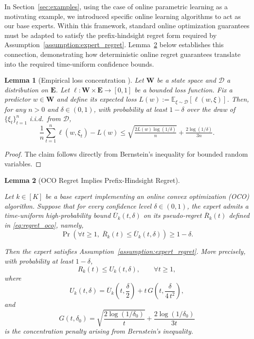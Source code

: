 \documentclass[a4paper,14pt]{extarticle}
\theoremstyle{plain}
\newtheorem{lemma}{Lemma}
\begin{document}
In Section~\ref{sec:examples}, using the case of online parametric learning as a motivating example, we introduced specific online learning algorithms to act as our base experts. Within this framework, standard online optimization guarantees must be adapted to satisfy the prefix-hindsight regret form required by Assumption~\ref{assumption:expert_regret}. Lemma~\ref{lem:prefix_to_expected} below establishes this connection, demonstrating how deterministic online regret guarantees translate into the required time-uniform confidence bounds.

\begin{lemma}[Empirical loss concentration {\normalfont\cite[Lemma B.10]{shalev2014understanding}}]
\label{lem:loss-eval}
Let $\mathbf{W}$ be a state space and $\mathcal{D}$ a distribution on $\mathbf{E}$. Let $\ell:\mathbf{W}\times\mathbf{E}\to [0,1]$ be a bounded loss function. Fix a predictor $w\in\mathbf{W}$ and define its expected loss $L(w):=\mathbb{E}_{\xi\sim\mathcal{D}}[\ell(w,\xi)]$. Then, for any $n>0$ and $\delta\in(0,1)$, with probability at least $1-\delta$ over the draw of $\{\xi_t\}_{t=1}^n$ i.i.d.\ from $\mathcal{D}$,
\begin{equation}
\frac{1}{n}\sum_{t=1}^n \ell(w,\xi_t) - L(w)
\le
\sqrt{\tfrac{2L(w)\log(1/\delta)}{n}} + \tfrac{2\log(1/\delta)}{3n}.
\end{equation}
\end{lemma}

\begin{proof}
The claim follows directly from Bernstein's inequality for bounded random variables.
\end{proof}


\begin{lemma}[OCO Regret Implies Prefix-Hindsight Regret]
\label{lem:prefix_to_expected}

Let $k \in [K]$ be a base expert implementing an online convex
optimization (OCO) algorithm. Suppose that for every confidence level
$\delta \in (0,1)$, the expert admits a time-uniform high-probability
bound $\overline U_k(t,\delta)$ on its pseudo-regret
$\overline R_k(t)$ defined in \eqref{eq:regret_oco}, namely,
\[
\Pr\!\left(
    \forall t \ge 1,\;
    \overline R_k(t)
    \le
    \overline U_k(t,\delta)
\right)
\ge 1-\delta.
\]

Then the expert satisfies
Assumption~\ref{assumption:expert_regret}. More precisely, with
probability at least $1-\delta$,
\[
R_k(t)
\le
U_k(t,\delta),
\qquad
\forall t \ge 1,
\]
where
\begin{equation}
\label{eq:expert_regret_bound_form}
U_k(t,\delta)
=
\overline U_k\!\left(t,\frac{\delta}{2}\right)
+
t\,G\!\left(t,\frac{\delta}{4\,t^2}\right),
\end{equation}
and
\begin{equation}
G(t,\delta_0)
=
\sqrt{\frac{2\log(1/\delta_0)}{t}}
+
\frac{2\log(1/\delta_0)}{3t}
\end{equation}
is the concentration penalty arising from Bernstein's inequality.

\end{lemma}
\end{document}
